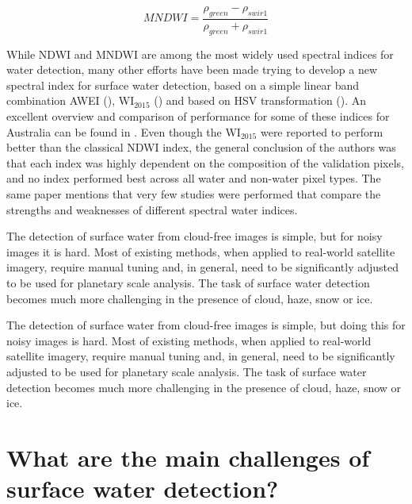 \begin{equation}
MNDWI =  \frac{\rho_{green} - \rho_{swir1}}{\rho_{green} + \rho_{swir1}} 
\end{equation}

While NDWI and MNDWI are among the most widely used spectral indices for water detection, many other efforts have been made trying to develop a new spectral index for surface water detection, based on a simple linear band combination AWEI (\citep{feyisa2014automated}), WI$_{2015}$ (\citep{fisher2016comparing}) and based on HSV transformation (\citep{pekel2014near}). An excellent overview and comparison of performance for some of these indices for Australia can be found in \citep{fisher2016comparing}. Even though the WI$_{2015}$ were reported to perform better than the classical NDWI index, the general conclusion of the authors was that each index was highly dependent on the composition of the validation pixels, and no index performed best across all water and non-water pixel types. The same paper mentions that very few studies were performed that compare the strengths and weaknesses of different spectral water indices. 

The detection of surface water from cloud-free images is simple, but for noisy images it is hard. Most of existing methods, when applied to real-world satellite imagery, require manual tuning and, in general, need to be significantly adjusted to be used for planetary scale analysis. The task of surface water detection becomes much more challenging in the presence of cloud, haze, snow or ice. 

The detection of surface water from cloud-free images is simple, but doing this for noisy images is hard. Most of existing methods, when applied to real-world satellite imagery, require manual tuning and, in general, need to be significantly adjusted to be used for planetary scale analysis. The task of surface water detection becomes much more challenging in the presence of cloud, haze, snow or ice. 

\section{What are the main challenges of surface water detection?}


